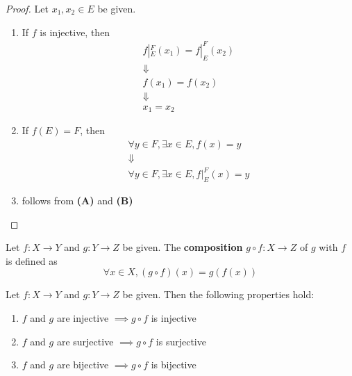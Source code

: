 \begin{proof}
    Let $x_{1}, x_{2} \in E$ be given.
    \begin{enumerate}[label=\textbf{(\Alph*)}]
        \item If $f$ is injective, then
        \[
        \begin{array}{c}
            f|_{E}^{F}(x_{1}) = f|_{E}^{F}(x_{2}) \\
            \Downarrow \\
            f(x_{1}) = f(x_{2}) \\
            \Downarrow \\
            x_{1} = x_{2}
        \end{array}
        \]
        \item If $f(E) = F$, then
        \[
        \begin{array}{c}
            \forall y \in F, \exists x \in E, f(x) = y \\
            \Downarrow \\
            \forall y \in F, \exists x \in E, f|_{E}^{F}(x) = y
        \end{array}
        \]
        \item follows from \textbf{(A)} and \textbf{(B)}
    \end{enumerate}
\end{proof}

\bigskip

\begin{definition} \label{an:def:composition-function}
    Let $f: X \to Y$ and $g: Y \to Z$ be given. The \textbf{composition} $g \circ f: X \to Z$ of $g$ with $f$ is defined as
    \[
    \forall x \in X, (g \circ f)(x) = g(f(x))
    \]
\end{definition}

\bigskip

\begin{theorem} \label{an:thm:properties-of-composition-functions}
    Let $f: X \to Y$ and $g: Y \to Z$ be given. Then the following properties hold:
    \begin{enumerate}[label=\textbf{(\Alph*)}]
        \item $f$ and $g$ are injective $\implies g \circ f$ is injective
        \item $f$ and $g$ are surjective $\implies g \circ f$ is surjective
        \item $f$ and $g$ are bijective $\implies g \circ f$ is bijective
    \end{enumerate}
\end{theorem}

